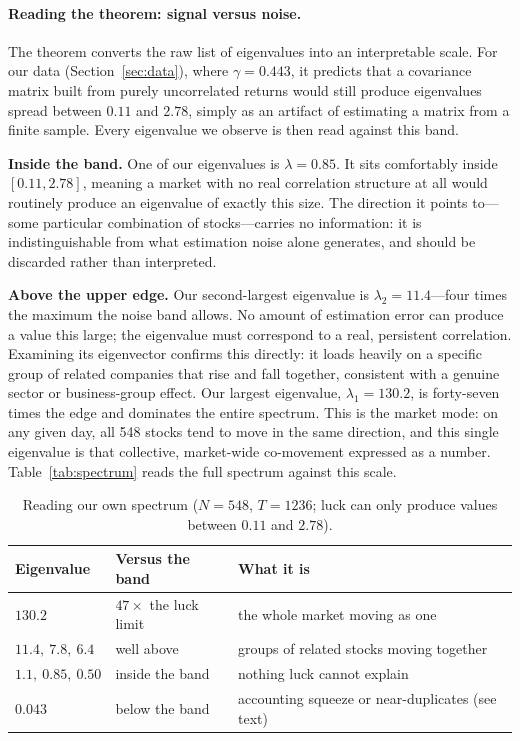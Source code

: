 \documentclass[11pt]{article}
\begin{document}
\paragraph{Reading the theorem: signal versus noise.}
The theorem converts the raw list of eigenvalues
into an interpretable scale. For our data (Section~\ref{sec:data}), where $\gamma = 0.443$, it
predicts that a covariance matrix built from purely uncorrelated returns would still produce
eigenvalues spread between $0.11$ and $2.78$, simply as an artifact of estimating a matrix from a
finite sample. Every eigenvalue we observe is then read against this band.

\textbf{Inside the band.} One of our eigenvalues is $\lambda = 0.85$. It sits comfortably inside
$[0.11, 2.78]$, meaning a market with no real correlation structure at all would routinely produce
an eigenvalue of exactly this size. The direction it points to---some particular combination of
stocks---carries no information: it is indistinguishable from what estimation noise alone
generates, and should be discarded rather than interpreted.

\textbf{Above the upper edge.} Our second-largest eigenvalue is $\lambda_2 = 11.4$---four times
the maximum the noise band allows. No amount of estimation error can produce a value this large;
the eigenvalue must correspond to a real, persistent correlation. Examining its eigenvector
confirms this directly: it loads heavily on a specific group of related companies that rise and
fall together, consistent with a genuine sector or business-group effect. Our largest eigenvalue,
$\lambda_1 = 130.2$, is forty-seven times the edge and dominates the entire spectrum. This is the
market mode: on any given day, all 548 stocks tend to move in the same direction, and this single
eigenvalue is that collective, market-wide co-movement expressed as a number. Table~\ref{tab:spectrum}
reads the full spectrum against this scale.



\begin{table}[t]
\centering
\caption{Reading our own spectrum ($N=548$, $T=1236$; luck can only
produce values between $0.11$ and $2.78$).}
\label{tab:reading}
\small
\begin{tabular}{lll}
\toprule
Eigenvalue & Versus the band & What it is \\
\midrule
$130.2$ & $47\times$ the luck limit & the whole market moving as one \\
$11.4,\ 7.8,\ 6.4$ & well above & groups of related stocks moving together \\
$1.1,\ 0.85,\ 0.50$ & inside the band & nothing luck cannot explain \\
$0.043$ & below the band & accounting squeeze or near-duplicates (see text) \\
\bottomrule
\end{tabular}
\end{table}
\end{document}
